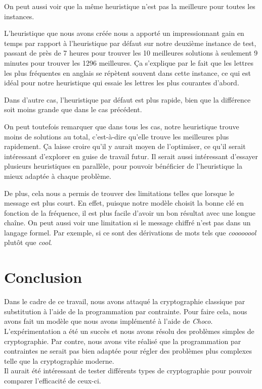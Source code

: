 \documentclass[11pt]{article}
\begin{document}
		On peut aussi voir que la même heuristique n'est pas la meilleure pour toutes les instances.

		L'heuristique que nous avons créée nous a apporté un impressionnant gain en temps par rapport à l'heuristique par défaut sur notre deuxième instance de test, passant de près de 7 heures pour trouver les 10 meilleures solutions à seulement 9 minutes pour trouver les 1296 meilleures.
		Ça s'explique par le fait que les lettres les plus fréquentes en anglais se répètent souvent dans cette instance, ce qui est idéal pour notre heuristique qui essaie les lettres les plus courantes d'abord.

		Dans d'autre cas, l'heuristique par défaut est plus rapide, bien que la différence soit moins grande que dans le cas précédent.

		On peut toutefois remarquer que dans tous les cas, notre heuristique trouve moins de solutions au total, c'est-à-dire qu'elle trouve les meilleures plus rapidement.
		Ça laisse croire qu'il y aurait moyen de l'optimiser, ce qu'il serait intéressant d'explorer en guise de travail futur.
		Il serait aussi intéressant d'essayer plusieurs heuristiques en parallèle, pour pouvoir bénéficier de l'heuristique la mieux adaptée à chaque problème.

		De plus, cela nous a permis de trouver des limitations telles que lorsque le message est plus court.
		En effet, puisque notre modèle choisit la bonne clé en fonction de la fréquence, il est plus facile d'avoir un bon résultat avec une longue chaîne.
		On peut aussi voir une limitation si le message chiffré n'est pas dans un langage formel. Par exemple, si ce sont des dérivations de mots tels que \emph{coooooool} plutôt que \emph{cool}.\\

	\section{Conclusion}

		Dans le cadre de ce travail, nous avons attaqué la cryptographie classique par substitution à l'aide de la programmation par contrainte. Pour faire cela, nous avons fait un modèle que nous avons implémenté à l'aide de \emph{Choco}. L'expérimentation a été un succès et nous avons résolu des problèmes simples de cryptographie. Par contre, nous avons vite réalisé que la programmation par contraintes ne serait pas bien adaptée pour régler des problèmes plus complexes telle que la cryptographie moderne.\\

		Il aurait été intéressant de tester différents types de cryptographie pour pouvoir comparer l'efficacité de ceux-ci.
\end{document}
